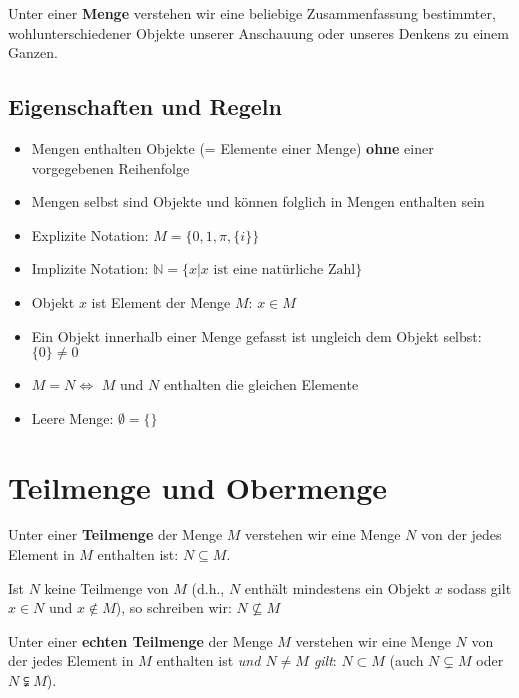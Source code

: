 \documentclass[../../main.tex]{subfiles}
\begin{document}
	\begin{definition}[Menge]
		\label{def:Menge}
		Unter einer \textbf{Menge} verstehen wir eine beliebige Zusammenfassung bestimmter, wohlunterschiedener Objekte unserer Anschauung oder unseres Denkens zu einem Ganzen. 
	\end{definition}

	\subsection*{Eigenschaften und Regeln}
	\begin{itemize}
		\item Mengen enthalten Objekte (= Elemente einer Menge) \textbf{ohne} einer vorgegebenen Reihenfolge
		\item Mengen selbst sind Objekte und können folglich in Mengen enthalten sein
		\item Explizite Notation: $M = \{0, 1, \pi, \{i\}\}$
		\item Implizite Notation: $\mathbb{N} = \{x|x \textrm{ ist eine natürliche Zahl}\}$
		\item Objekt $x$ ist Element der Menge $M$: $x \in M$
		\item Ein Objekt innerhalb einer Menge gefasst ist ungleich dem Objekt selbst: $\{0\} \not= 0$
		\item $M = N \Leftrightarrow$ $M$ und $N$ enthalten die gleichen Elemente 
		\item Leere Menge: $\emptyset = \{\}$ 
	\end{itemize}



	\section{Teilmenge und Obermenge}

	\begin{definition}[Teilmenge]
		Unter einer \textbf{Teilmenge} der Menge $M$ verstehen wir eine Menge $N$ von der jedes Element in $M$ enthalten ist: $N \subseteq M$.
	\end{definition}

	Ist $N$ keine Teilmenge von $M$ (d.h., $N$ enthält mindestens ein Objekt $x$ sodass gilt $x \in N$ und $x \not\in M$), so schreiben wir: $N \not \subseteq M$

	\begin{definition}
		Unter einer \textbf{echten Teilmenge} der Menge $M$ verstehen wir eine Menge $N$ von der jedes Element in $M$ enthalten ist \textit{und $N \not= M$ gilt}: $N \subset M$ (auch $N \subsetneq M$ oder $N \subsetneqq M$). 
	\end{definition}
\end{document}
